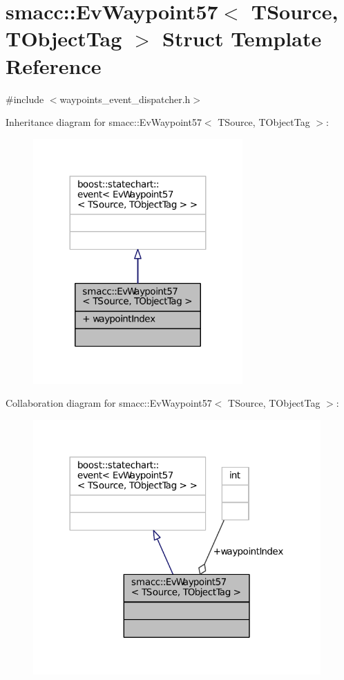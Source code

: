 \hypertarget{structsmacc_1_1EvWaypoint57}{}\section{smacc\+:\+:Ev\+Waypoint57$<$ T\+Source, T\+Object\+Tag $>$ Struct Template Reference}
\label{structsmacc_1_1EvWaypoint57}


{\ttfamily \#include $<$waypoints\+\_\+event\+\_\+dispatcher.\+h$>$}



Inheritance diagram for smacc\+:\+:Ev\+Waypoint57$<$ T\+Source, T\+Object\+Tag $>$\+:
\nopagebreak
\begin{figure}[H]
\begin{center}
\leavevmode
\includegraphics[width=227pt]{structsmacc_1_1EvWaypoint57__inherit__graph}
\end{center}
\end{figure}


Collaboration diagram for smacc\+:\+:Ev\+Waypoint57$<$ T\+Source, T\+Object\+Tag $>$\+:
\nopagebreak
\begin{figure}[H]
\begin{center}
\leavevmode
\includegraphics[width=312pt]{structsmacc_1_1EvWaypoint57__coll__graph}
\end{center}
\end{figure}
